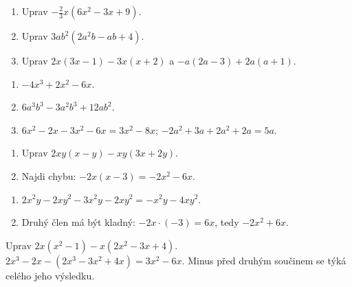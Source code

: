 \documentclass[11pt,a4paper]{article}
\begin{document}



\begin{zadaniReseniBox}[title={Základ: roznásobení a následné sloučení},breakable=false]
\begin{enumerate}[label=\alph*)]
\item Uprav $-\frac23x(6x^2-3x+9)$.
\item Uprav $3ab^2(2a^2b-ab+4)$.
\item Uprav $2x(3x-1)-3x(x+2)$ a $-a(2a-3)+2a(a+1)$.
\end{enumerate}
\tcblower
\begin{enumerate}[label=\alph*)]
\item $-4x^3+2x^2-6x$.
\item $6a^3b^3-3a^2b^3+12ab^2$.
\item $6x^2-2x-3x^2-6x=3x^2-8x$; $-2a^2+3a+2a^2+2a=5a$.
\end{enumerate}
\end{zadaniReseniBox}

\begin{zadaniReseniBox}[title={Rezerva: propojení dvou proměnných},breakable=false]
\begin{enumerate}[label=\alph*)]
\item Uprav $2xy(x-y)-xy(3x+2y)$.
\item Najdi chybu: $-2x(x-3)=-2x^2-6x$.
\end{enumerate}
\tcblower
\begin{enumerate}[label=\alph*)]
\item $2x^2y-2xy^2-3x^2y-2xy^2=-x^2y-4xy^2$.
\item Druhý člen má být kladný: $-2x\cdot(-3)=6x$, tedy $-2x^2+6x$.
\end{enumerate}
\end{zadaniReseniBox}


\begin{prikladReseniBox}[title={Rozšíření procvičení},breakable=false]
Uprav $2x(x^2-1)-x(2x^2-3x+4)$.
\tcblower
$2x^3-2x-(2x^3-3x^2+4x)=3x^2-6x$. Minus před druhým součinem se týká celého jeho výsledku.
\end{prikladReseniBox}
\end{document}
